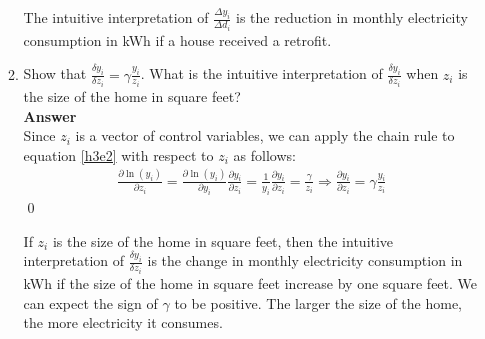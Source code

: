 \documentclass{article}
\begin{document}
\begin{enumerate}
\begin{enumerate}
    The intuitive interpretation of $\frac{\Delta y_i}{\Delta d_i}$ is the reduction in monthly electricity consumption in kWh if a house received a retrofit.
    \item Show that $\frac{\delta y_i}{\delta z_i}=\gamma\frac{y_i}{z_i}$. What is the intuitive interpretation of $\frac{\delta y_i}{\delta z_i}$ when $z_i$ is the size of the home in square feet?
    \\\textbf{Answer}\\
    Since $z_i$ is a vector of control variables, we can apply the chain rule to equation \eqref{h3e2} with respect to $z_i$ as follows:
    \begin{align}
        \frac{\partial \ln(y_i)}{\partial z_i}=\frac{\partial \ln(y_i)}{\partial y_i}\frac{\partial y_i}{\partial z_i}=\frac{1}{y_i}\frac{\partial y_i}{\partial z_i}=\frac{\gamma}{z_i}\Rightarrow \frac{\partial y_i}{\partial z_i}=\gamma\frac{y_i}{z_i} \label{h3e8}
    \end{align}\qed

    If $z_i$ is the size of the home in square feet, then the intuitive interpretation of $\frac{\delta y_i}{\delta z_i}$ is the change in monthly electricity consumption in kWh if the size of the home in square feet increase by one square feet. We can expect the sign of $\gamma$ to be positive. The larger the size of the home, the more electricity it consumes.


\end{enumerate}
\end{enumerate}
\end{document}

